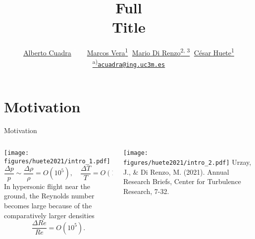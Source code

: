 \documentclass[9pt, aspectratio=1609]{beamer}
\title[
    Title in Sidebar]{
    \huge Full\\[2mm] Title
    }
\author[
    \href{https://acuadralara.com}{A. Cuadra (presenter)}\\      
    \href{http://fluidosuc3m.es/people/mvcoello/}{M. Vera},
    \href{https://scholar.google.it/citations?user=jwcooaAAAAAJ&hl=en}{M. Di Renzo},
    \href{http://fluidosuc3m.es/people/chuete/}{C. Huete}]
{ 
    \textcolor{white}{\href{https://acuadralara.com}{\underline{Alberto Cuadra}} \textsuperscript{1, a}, \href{http://fluidosuc3m.es/people/mvcoello/}{Marcos Vera\textsuperscript{1}}, \href{https://scholar.google.it/citations?user=jwcooaAAAAAJ&hl=en}{Mario Di Renzo\textsuperscript{2, 3}}, \href{http://fluidosuc3m.es/people/chuete/}{César Huete\textsuperscript{1}}
    }\newline
    \href{mailto:acuadra@ing.uc3m.es}{{\textsuperscript{a)}\tt acuadra@ing.uc3m.es}}
}
\date{AIAA SciTech Forum 2023, National Harbor, MD $\mid$  January 23-27, 2023

\footnotesize{\\[3mm] Copyright © by A. Cuadra, M. Vera, M. Di Renzo, C. Huete $\mid$ Universidad Carlos III de Madrid\\
Published by the American Institute of Aeronautics and Astronautics, Inc., with permission}
}
\institute[
    {
    \href{https://doi.org/10.1063/5.0059948}{\vspace{0.2cm}\texttt{[image: figures/qr/qr\_huete2021.pdf]}}
    \href{https://www.aiaa.org/}{\vspace{-0.025cm}\texttt{[image: figures/logos/logo\_AIAA\_white.pdf]}}
    }]
    {
    \footnotesize
    \textsuperscript{1)} Departamento de Ingenier\'{\i}a T\'{e}rmica y de Fluidos, Escuela~Polit\'{e}cnica~Superior, Universidad~Carlos~III~de~Madrid\\
    \textsuperscript{2)} Department of Engineering for Innovation, University of Salento, Lecce 73100, Italy\\
    \textsuperscript{3)} Center for Turbulence Research, Stanford University, Stanford, 94305, USA
  
}
\begin{document}
{
    \aauwavesbg
    \begin{frame}
        \titlepage
    \end{frame}
}
\section{Motivation}
\begin{frame}{\large Motivation}

\setlength{\leftmargini}{1em}
\begin{columns}[c, onlytextwidth]%
    \begin{column}{.4\textwidth}%
        \texttt{[image: figures/huete2021/intro\_1.pdf]}
        \begin{equation*}
            \dfrac{\Delta p}{p} \sim \dfrac{\Delta \rho}{\rho} = O(10^5), \quad \dfrac{\Delta T}{T} = O(1).
        \end{equation*}
        In hypersonic flight near the ground, the Reynolds number becomes large because of the comparatively larger densities
        \begin{equation*}
            \dfrac{\Delta Re}{Re} = O(10^5).
        \end{equation*}
    \end{column}%
    \begin{column}{.6\textwidth}
        \begin{center}
            \texttt{[image: figures/huete2021/intro\_2.pdf]}
            \scriptsize{Urzay, J., \& Di Renzo, M. (2021). Annual Research Briefs, Center for Turbulence Research, 7-32.}
        \end{center}
    \end{column}%
\end{columns}

\end{frame}
\end{document}
